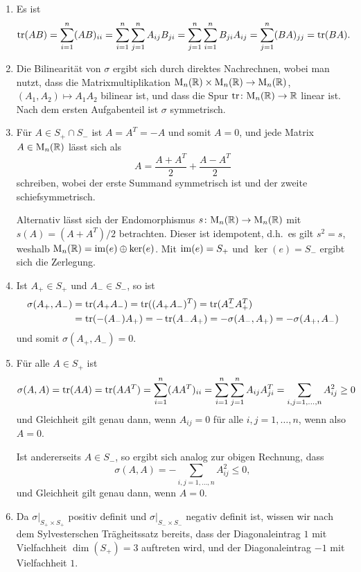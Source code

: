\documentclass[a4paper, 10pt]{scrartcl}
\begin{document}
\begin{solution}
  \begin{enumerate}[leftmargin=*]
    \item
      Es ist
      \[
          \operatorname{tr}(AB)
        = \sum_{i=1}^n (AB)_{ii}
        = \sum_{i=1}^n \sum_{j=1}^n A_{ij} B_{ji}
        = \sum_{j=1}^n \sum_{i=1}^n B_{ji} A_{ij}
        = \sum_{j=1}^n (BA)_{jj}
        = \operatorname{tr}(BA).
      \]
    \item
      Die Bilinearität von $\sigma$ ergibt sich durch direktes Nachrechnen, wobei man nutzt, dass die Matrixmultiplikation $\mathrm{M}_n(\mathbb{R}) \times \mathrm{M}_n(\mathbb{R}) \to \mathrm{M}_n(\mathbb{R})$, $(A_1, A_2) \mapsto A_1 A_2$ bilinear ist, und dass die Spur $\operatorname{tr} \colon \mathrm{M}_n(\mathbb{R}) \to \mathbb{R}$ linear ist.
      Nach dem ersten Aufgabenteil ist $\sigma$ symmetrisch.
    \item
      Für $A \in S_+ \cap S_-$ ist $A = A^T = -A$ und somit $A = 0$, und jede Matrix $A \in \mathrm{M}_n(\mathbb{R})$ lässt sich als
      \[
        A = \frac{A + A^T}{2} + \frac{A - A^T}{2}
      \]
      schreiben, wobei der erste Summand symmetrisch ist und der zweite schiefsymmetrisch.
      
      Alternativ lässt sich der Endomorphismus $s \colon \mathrm{M}_n(\mathbb{R}) \to \mathrm{M}_n(\mathbb{R})$ mit $s(A) = (A + A^T)/2$ betrachten.
      Dieser ist idempotent, d.h.\ es gilt $s^2 = s$, weshalb $\mathrm{M}_n(\mathbb{R}) = \operatorname{im}(e) \oplus \ker(e)$.
      Mit $\operatorname{im}(e) = S_+$ und $\ker(e) = S_-$ ergibt sich die Zerlegung.
    \item
      Ist $A_+ \in S_+$ und $A_- \in S_-$, so ist
      \begin{align*}
             \sigma(A_+, A_-)
        &=   \operatorname{tr}( A_+ A_- )
         =   \operatorname{tr}( (A_+ A_-)^T )
         =   \operatorname{tr}( A_-^T A_+^T ) \\
        &=   \operatorname{tr}( -(A_-) A_+ )
         =  -\operatorname{tr}( A_- A_+)
         =  -\sigma(A_-, A_+)
         =  -\sigma(A_+, A_-)
      \end{align*}
      und somit $\sigma(A_+, A_-) = 0$.
    \item
      Für alle $A \in S_+$ ist
      \[
              \sigma(A, A)
        =     \operatorname{tr}(A A)
        =     \operatorname{tr}(A A^T)
        =     \sum_{i=1}^n (A A^T)_{ii}
        =     \sum_{i=1}^n \sum_{j=1}^n A_{ij} A^T_{ji}
        =     \sum_{i,j = 1, \dotsc, n} A_{ij}^2
        \geq  0
      \]
      und Gleichheit gilt genau dann, wenn $A_{ij} = 0$ für alle $i,j = 1, \dotsc, n$, wenn also $A = 0$.
      
      Ist andererseits $A \in S_-$, so ergibt sich analog zur obigen Rechnung, dass
      \[
                \sigma(A, A)
        =     - \sum_{i, j = 1, \dotsc, n} A_{ij}^2
        \leq    0,
      \]
      und Gleichheit gilt genau dann, wenn $A = 0$.
    \item
      Da $\sigma|_{S_+ \times S_+}$ positiv definit und $\sigma|_{S_- \times S_-}$ negativ definit ist, wissen wir nach dem Sylvesterschen Trägheitssatz bereits, dass der Diagonaleintrag $1$ mit Vielfachheit $\dim(S_+) = 3$ auftreten wird, und der Diagonaleintrag $-1$ mit Vielfachheit $1$.
      

\end{enumerate}
\end{solution}
\end{document}
